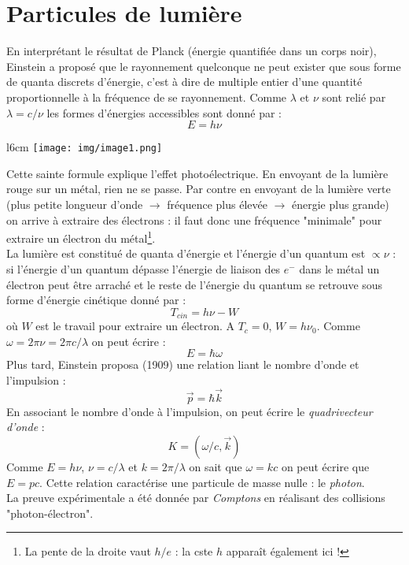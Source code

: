 \documentclass[british,french,11pt, a4paper, openany]{book}
\begin{document}
	\section{Particules de lumière}
	En interprétant le résultat de Planck (énergie quantifiée dans un corps noir), Einstein a proposé que le rayonnement quelconque ne peut exister que sous forme de quanta discrets d'énergie, c'est à dire de multiple entier d'une quantité proportionnelle à la fréquence de se rayonnement. Comme $\lambda$ et $\nu$ sont relié par $\lambda = c/\nu$ les formes d'énergies accessibles sont donné par :
	\begin{equation}
		E = h\nu
	\end{equation}
	\begin{wrapfigure}[7]{l}{6cm}
		\texttt{[image: img/image1.png]}
	\end{wrapfigure}
	Cette sainte formule explique l'effet photoélectrique. En envoyant de la lumière rouge sur un métal, rien ne se passe. Par contre en envoyant de la lumière verte (plus petite longueur d'onde $\rightarrow$ fréquence plus élevée $\rightarrow$ énergie plus grande) on arrive à extraire des électrons : il faut donc une fréquence "minimale" pour extraire un électron du métal\footnote{La pente de la droite vaut $h/e$ : la cste $h$ apparaît également ici !}.\\
	La lumière est constitué de quanta d'énergie et l'énergie d'un quantum est $\propto \nu$ : si l'énergie d'un quantum dépasse l'énergie de liaison des $e^-$ dans le métal un électron peut être arraché et le reste de l'énergie du quantum se retrouve sous forme d'énergie cinétique donné par :
	\begin{equation}
		T_{cin} = h\nu - W
	\end{equation}
	où $W$ est le travail pour extraire un électron. A $T_c = 0$, $W = h\nu_0$. Comme $\omega = 2\pi \nu = 2\pi c /\lambda$ on peut écrire :
	\begin{equation}\label{eq:ehbaromega}
		E = \hbar \omega
	\end{equation}
	Plus tard, Einstein proposa (1909) une relation liant le nombre d'onde et l'impulsion :
	\begin{equation}\label{eq:phbark}
		\vec{p} = \hbar \vec{k}
	\end{equation}
	En associant le nombre d'onde à l'impulsion, on peut écrire le \textit{quadrivecteur d'onde} :
	\begin{equation}\label{eq:Komegack}
		K = (\omega / c, \vec{k})
	\end{equation}
	Comme $E = h\nu$, $\nu = c/\lambda$ et $k = 2\pi/\lambda$ on sait que $\omega = kc$ on peut écrire que $E = pc$. Cette relation caractérise une particule de masse nulle : le \textit{photon}.\ \\
	La preuve expérimentale a été donnée par \textit{Comptons} en réalisant des collisions "photon-électron".\\
	
\end{document}
